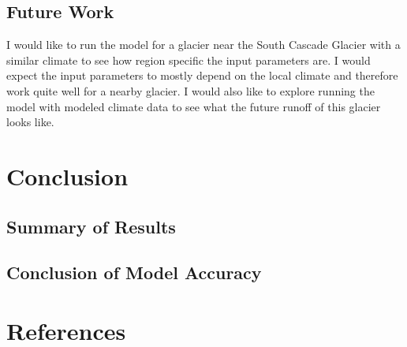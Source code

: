 \documentclass{article}
\begin{document}
\subsection{Future Work}
I would like to run the model for a glacier near the South Cascade Glacier with a similar climate to see how region specific the input 
parameters are. I would expect the input parameters to mostly depend on the local climate and therefore work quite well for a nearby glacier. 
I would also like to explore running the model with modeled climate data to see what the future runoff of this glacier looks like.
\section{Conclusion}
\subsection{Summary of Results}
\subsection{Conclusion of Model Accuracy}

\section{References}
\end{document}
